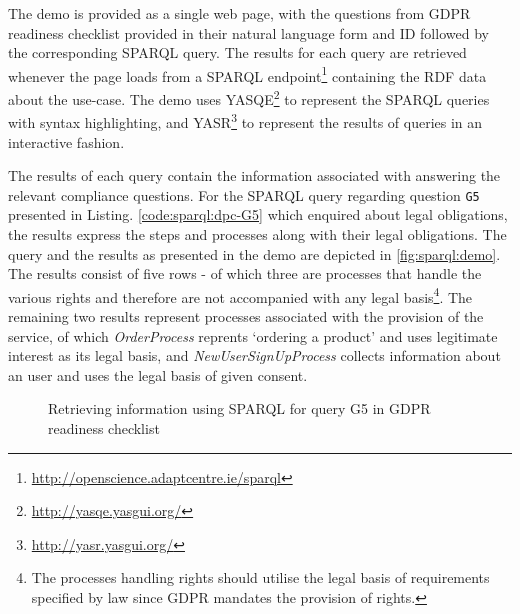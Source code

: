 The demo is provided as a single web page, with the questions from GDPR readiness checklist provided in their natural language form and ID followed by the corresponding SPARQL query.
The results for each query are retrieved whenever the page loads from a
SPARQL endpoint\footnote{\url{http://openscience.adaptcentre.ie/sparql}}
containing the RDF data about the use-case.
The demo uses YASQE\footnote{\url{http://yasqe.yasgui.org/}} to represent the SPARQL queries with syntax highlighting, and YASR\footnote{\url{http://yasr.yasgui.org/}} to represent the results of queries in an interactive fashion.

The results of each query contain the information associated with answering the relevant compliance questions. For the SPARQL query regarding question \texttt{G5} presented in Listing. \autoref{code:sparql:dpc-G5} which enquired about legal obligations, the results express the steps and processes along with their legal obligations.
The query and the results as presented in the demo are depicted in \autoref{fig:sparql:demo}.
The results consist of five rows - of which three are processes that handle the various rights and therefore are not accompanied with any legal basis\footnote{The processes handling rights should utilise the legal basis of requirements specified by law since GDPR mandates the provision of rights.}.
The remaining two results represent processes associated with the provision of the service, of which \textit{OrderProcess} reprents `ordering a product' and uses legitimate interest as its legal basis, and \textit{NewUserSignUpProcess} collects information about an user and uses the legal basis of given consent.
\begin{figure}[htbp]
\centering
{}
\caption{Retrieving information using SPARQL for query G5 in GDPR readiness checklist}
\label{fig:sparql:demo}
\end{figure}

